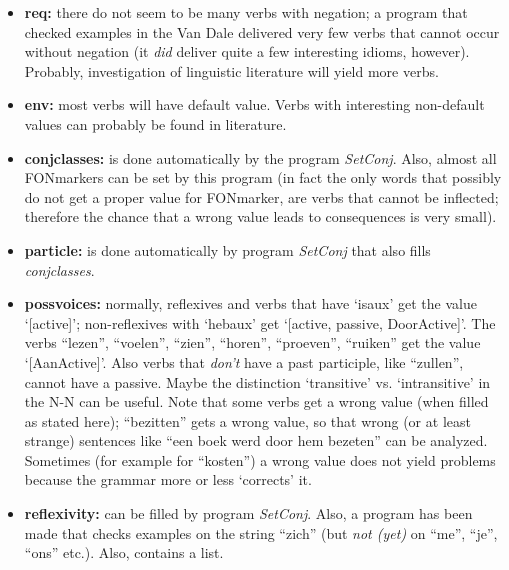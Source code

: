 \begin{itemize}
  \item {\bf req:} there do not seem to be many verbs with negation; a program 
        that checked examples in the Van Dale delivered  very few verbs that 
        cannot occur without negation (it {\em did} deliver quite a few 
        interesting idioms, however). Probably, investigation of linguistic 
        literature will yield more verbs.
         
  \item {\bf env:} most verbs will have default value. Verbs with interesting 
        non-default values can probably be found in literature.
 
  \item {\bf conjclasses:} is done automatically by the program {\em SetConj}.
         Also, almost all FONmarkers can be set by this program (in fact the 
         only words that possibly do not get a proper value for FONmarker, 
         are verbs that cannot be inflected; therefore the chance that a 
         wrong value leads to consequences is very small). 
 
  \item {\bf particle:} is done automatically by program {\em SetConj} that 
        also fills {\em conjclasses}.
 
  \item {\bf possvoices:} normally, reflexives and verbs that have `isaux' get 
        the value `[active]'; non-reflexives with `hebaux' get 
        `[active, passive, DoorActive]'. The verbs ``lezen'', ``voelen'', 
        ``zien'', ``horen'', ``proeven'', ``ruiken'' get the value 
        `[AanActive]'. Also verbs that {\em don't} have a past participle, 
        like ``zullen'', cannot have a passive. Maybe the distinction 
        `transitive' vs. `intransitive' in the N-N can be useful. 
        Note that some verbs get a wrong value (when filled as stated here); 
        ``bezitten'' gets a wrong value, so that wrong (or at least strange) 
        sentences like ``een boek werd door hem bezeten'' 
        can be analyzed. Sometimes (for example for ``kosten'') a wrong value 
        does not yield 
        problems because the grammar more or less `corrects' it.
 
  \item {\bf reflexivity:} can be filled by program {\em SetConj}.
        Also, a program has been made that checks examples on the string 
        ``zich'' (but {\em not (yet)} on ``me'', ``je'', ``ons'' etc.). 
        Also, \cite{an:s84} contains a list.
 

\end{itemize}
